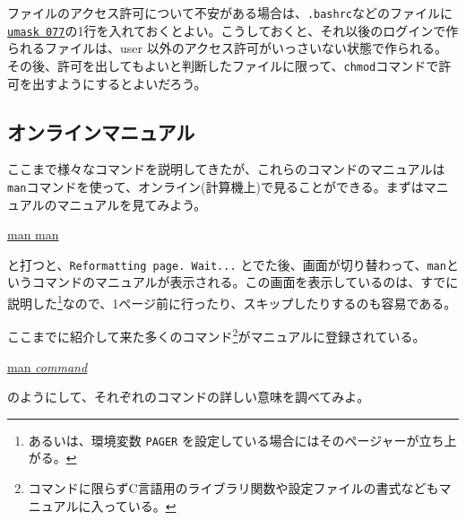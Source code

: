 ファイルのアクセス許可について不安がある場合は、{\tt .bashrc}などのファイルに
\underline{\tt umask 077}の1行を入れておくとよい。こうしておくと、それ以後のログインで作られるファイルは、user 以外のアクセス許可がいっさいない状態で作られる。その後、許可を出してもよいと判断したファイルに限って、{\tt chmod}コマンドで許可を出すようにするとよいだろう。

\subsection{オンラインマニュアル}
ここまで様々なコマンドを説明してきたが、これらのコマンドのマニュアルは{\tt man}コマンドを使って、オンライン(計算機上)で見ることができる。まずはマニュアルのマニュアルを見てみよう。
\begin{commandline2}
\prompt \underline{man man}
\end{commandline2} \noindent
と打つと、{\tt Reformatting page.  Wait...} とでた後、画面が切り替わって、{\tt man}というコマンドのマニュアルが表示される。この画面を表示しているのは、すでに説明した{\tt \pager}\footnote{あるいは、環境変数 {\tt PAGER} を設定している場合にはそのページャーが立ち上がる。}なので、1ページ前に行ったり、スキップしたりするのも容易である。

ここまでに紹介して来た多くのコマンド\footnote{コマンドに限らずC言語用のライブラリ関数や設定ファイルの書式などもマニュアルに入っている。}がマニュアルに登録されている。
\begin{commandline2}
\prompt \underline{man {\it command}}
\end{commandline2} \noindent
のようにして、それぞれのコマンドの詳しい意味を調べてみよ。

